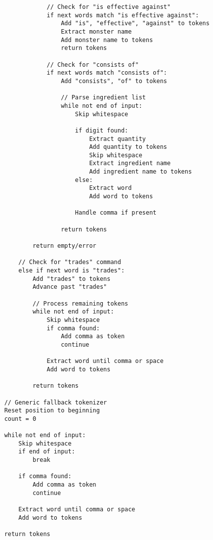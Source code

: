 \documentclass{article}
\begin{document}
\begin{verbatim}
                // Check for "is effective against"
                if next words match "is effective against":
                    Add "is", "effective", "against" to tokens
                    Extract monster name
                    Add monster name to tokens
                    return tokens
                    
                // Check for "consists of"
                if next words match "consists of":
                    Add "consists", "of" to tokens
                    
                    // Parse ingredient list
                    while not end of input:
                        Skip whitespace
                        
                        if digit found:
                            Extract quantity
                            Add quantity to tokens
                            Skip whitespace
                            Extract ingredient name
                            Add ingredient name to tokens
                        else:
                            Extract word
                            Add word to tokens
                            
                        Handle comma if present
                    
                    return tokens
            
            return empty/error
            
        // Check for "trades" command
        else if next word is "trades":
            Add "trades" to tokens
            Advance past "trades"
            
            // Process remaining tokens
            while not end of input:
                Skip whitespace
                if comma found:
                    Add comma as token
                    continue
                
                Extract word until comma or space
                Add word to tokens
                
            return tokens
    
    // Generic fallback tokenizer
    Reset position to beginning
    count = 0
    
    while not end of input:
        Skip whitespace
        if end of input:
            break
            
        if comma found:
            Add comma as token
            continue
            
        Extract word until comma or space
        Add word to tokens
        
    return tokens
\end{verbatim}
\end{document}
